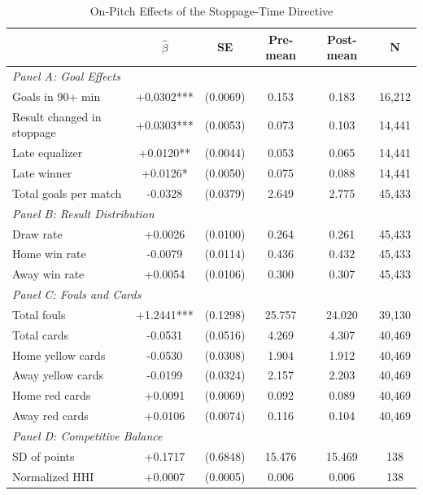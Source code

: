 \begin{table}[htbp]
\centering
\caption{On-Pitch Effects of the Stoppage-Time Directive}
\label{tab:onpitch_effects_v3}
\small
\begin{threeparttable}
\begin{tabular}{lccccc}
\toprule
 & $\hat{\beta}$ & SE & Pre-mean & Post-mean & N \\
\midrule
\multicolumn{6}{l}{\textit{Panel A: Goal Effects}} \\
  Goals in 90+ min & +0.0302*** & (0.0069) & 0.153 & 0.183 & 16,212 \\
  Result changed in stoppage & +0.0303*** & (0.0053) & 0.073 & 0.103 & 14,441 \\
  Late equalizer & +0.0120** & (0.0044) & 0.053 & 0.065 & 14,441 \\
  Late winner & +0.0126* & (0.0050) & 0.075 & 0.088 & 14,441 \\
  Total goals per match & -0.0328 & (0.0379) & 2.649 & 2.775 & 45,433 \\
\midrule
\multicolumn{6}{l}{\textit{Panel B: Result Distribution}} \\
  Draw rate & +0.0026 & (0.0100) & 0.264 & 0.261 & 45,433 \\
  Home win rate & -0.0079 & (0.0114) & 0.436 & 0.432 & 45,433 \\
  Away win rate & +0.0054 & (0.0106) & 0.300 & 0.307 & 45,433 \\
\midrule
\multicolumn{6}{l}{\textit{Panel C: Fouls and Cards}} \\
  Total fouls & +1.2441*** & (0.1298) & 25.757 & 24.020 & 39,130 \\
  Total cards & -0.0531 & (0.0516) & 4.269 & 4.307 & 40,469 \\
  Home yellow cards & -0.0530 & (0.0308) & 1.904 & 1.912 & 40,469 \\
  Away yellow cards & -0.0199 & (0.0324) & 2.157 & 2.203 & 40,469 \\
  Home red cards & +0.0091 & (0.0069) & 0.092 & 0.089 & 40,469 \\
  Away red cards & +0.0106 & (0.0074) & 0.116 & 0.104 & 40,469 \\
\midrule
\multicolumn{6}{l}{\textit{Panel D: Competitive Balance}} \\
  SD of points & +0.1717 & (0.6848) & 15.476 & 15.469 & 138 \\
  Normalized HHI & +0.0007 & (0.0005) & 0.006 & 0.006 & 138 \\
\bottomrule
\end{tabular}

\end{threeparttable}
\end{table}

